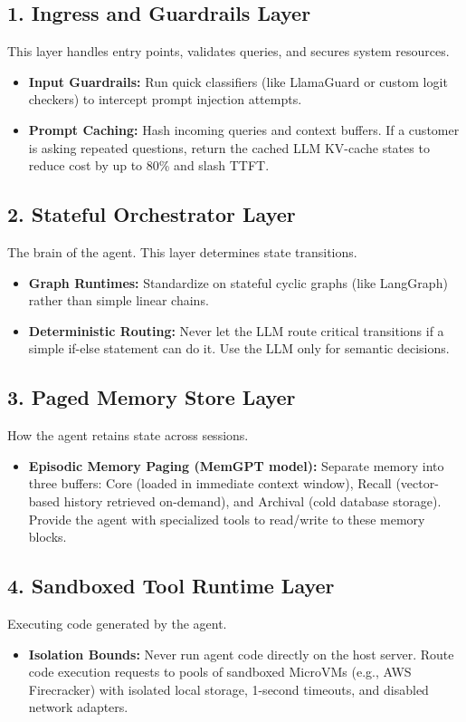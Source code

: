 \subsection{1. Ingress and Guardrails Layer}
This layer handles entry points, validates queries, and secures system resources.
\begin{itemize}
    \item \textbf{Input Guardrails:} Run quick classifiers (like LlamaGuard or custom logit checkers) to intercept prompt injection attempts.
    \item \textbf{Prompt Caching:} Hash incoming queries and context buffers. If a customer is asking repeated questions, return the cached LLM KV-cache states to reduce cost by up to 80\% and slash TTFT.
\end{itemize}

\subsection{2. Stateful Orchestrator Layer}
The brain of the agent. This layer determines state transitions.
\begin{itemize}
    \item \textbf{Graph Runtimes:} Standardize on stateful cyclic graphs (like LangGraph) rather than simple linear chains.
    \item \textbf{Deterministic Routing:} Never let the LLM route critical transitions if a simple if-else statement can do it. Use the LLM only for semantic decisions.
\end{itemize}

\subsection{3. Paged Memory Store Layer}
How the agent retains state across sessions.
\begin{itemize}
    \item \textbf{Episodic Memory Paging (MemGPT model):} Separate memory into three buffers: Core (loaded in immediate context window), Recall (vector-based history retrieved on-demand), and Archival (cold database storage). Provide the agent with specialized tools to read/write to these memory blocks.
\end{itemize}

\subsection{4. Sandboxed Tool Runtime Layer}
Executing code generated by the agent.
\begin{itemize}
    \item \textbf{Isolation Bounds:} Never run agent code directly on the host server. Route code execution requests to pools of sandboxed MicroVMs (e.g., AWS Firecracker) with isolated local storage, 1-second timeouts, and disabled network adapters.
\end{itemize}

